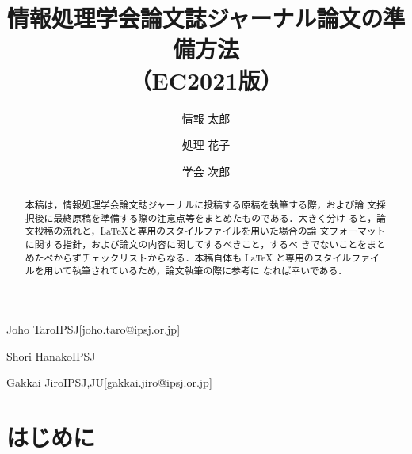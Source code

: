 \documentclass[submit,techreq,noauthor]{ec2021}
\begin{document}
\title{情報処理学会論文誌ジャーナル論文の準備方法\\
（EC2021版）}





\author{情報 太郎}{Joho Taro}{IPSJ}[joho.taro@ipsj.or.jp]
\author{処理 花子}{Shori Hanako}{IPSJ}
\author{学会 次郎}{Gakkai Jiro}{IPSJ,JU}[gakkai.jiro@ipsj.or.jp]

\begin{abstract}
本稿は，情報処理学会論文誌ジャーナルに投稿する原稿を執筆する際，および論
文採択後に最終原稿を準備する際の注意点等をまとめたものである．大きく分け
ると，論文投稿の流れと，\LaTeX と専用のスタイルファイルを用いた場合の論
文フォーマットに関する指針，および論文の内容に関してするべきこと，するべ
きでないことをまとめたべからずチェックリストからなる．本稿自体も \LaTeX 
と専用のスタイルファイルを用いて執筆されているため，論文執筆の際に参考に
なれば幸いである．
\end{abstract}


%



\maketitle

\section{はじめに}
\label{sec:start}
\end{document}
